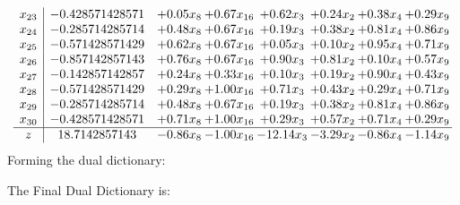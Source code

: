 \documentclass[8pt]{article}
\begin{document}
\[\begin{array}{c| c c@{\hskip 2pt} c@{\hskip 2pt} c@{\hskip 2pt} c@{\hskip 2pt} c@{\hskip 2pt} c@{\hskip 2pt} }
 x_{23}   &  -0.428571428571 & +  0.05 x_{8} & +  0.67 x_{16} & +  0.62 x_{3} & +  0.24 x_{2} & +  0.38 x_{4} & +  0.29 x_{9}\\
 x_{24}   &  -0.285714285714 & +  0.48 x_{8} & +  0.67 x_{16} & +  0.19 x_{3} & +  0.38 x_{2} & +  0.81 x_{4} & +  0.86 x_{9}\\
 x_{25}   &  -0.571428571429 & +  0.62 x_{8} & +  0.67 x_{16} & +  0.05 x_{3} & +  0.10 x_{2} & +  0.95 x_{4} & +  0.71 x_{9}\\
 x_{26}   &  -0.857142857143 & +  0.76 x_{8} & +  0.67 x_{16} & +  0.90 x_{3} & +  0.81 x_{2} & +  0.10 x_{4} & +  0.57 x_{9}\\
 x_{27}   &  -0.142857142857 & +  0.24 x_{8} & +  0.33 x_{16} & +  0.10 x_{3} & +  0.19 x_{2} & +  0.90 x_{4} & +  0.43 x_{9}\\
 x_{28}   &  -0.571428571429 & +  0.29 x_{8} & +  1.00 x_{16} & +  0.71 x_{3} & +  0.43 x_{2} & +  0.29 x_{4} & +  0.71 x_{9}\\
 x_{29}   &  -0.285714285714 & +  0.48 x_{8} & +  0.67 x_{16} & +  0.19 x_{3} & +  0.38 x_{2} & +  0.81 x_{4} & +  0.86 x_{9}\\
 x_{30}   &  -0.428571428571 & +  0.71 x_{8} & +  1.00 x_{16} & +  0.29 x_{3} & +  0.57 x_{2} & +  0.71 x_{4} & +  0.29 x_{9}\\
\hline
z    &  18.7142857143 & -0.86 x_{8} & -1.00 x_{16} & -12.14 x_{3} & -3.29 x_{2} & -0.86 x_{4} & -1.14 x_{9}\\
\end{array}\]
Forming the dual dictionary:

The Final Dual Dictionary is: 
\end{document}
